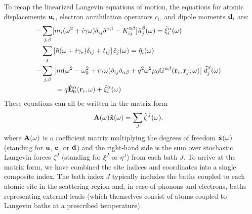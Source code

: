 To recap the linearized Langevin equations of motion, the equations for atomic displacements $\mathbf{u}_i$, electron annihilation operators $c_i$, and dipole moments $\mathbf{d}_i$ are:
\begin{subequations}
\begin{align}
   - & \sum_{j,\beta}  [m_i (\omega^2+i\gamma \omega) \delta_{ij}\delta^{\alpha\beta} - K_{ij}^{\alpha\beta}] \tilde{u}_j^{\beta}(\omega) = \tilde \xi_i^{\alpha}(\omega)  \\
  &  \sum_{j} \left[\hbar (\omega+i\gamma_e) \delta_{ij} + t_{ij} \right] \tilde c_j(\omega) = \tilde \eta_i(\omega)  \\
  - & \sum_{j,\beta} \left[m(\omega^2-\omega_0^2+i\gamma\omega) \delta_{ij}\delta_{\alpha\beta} +q^2 \omega^2 \mu_0 \mathbb{G}^{\alpha\beta}(\mathbf{r}_i,\mathbf{r}_j;\omega) \right]\tilde{d}_j^{\beta}(\omega) \notag \\
  & \qquad = q\tilde{\mathbf{E}}_0^{\alpha}(\mathbf{r}_i,\omega) + \tilde{\xi}^{\alpha}_i(\omega)
\end{align}
\end{subequations}
These equations can all be written in the matrix form
\begin{equation}
 \mathbf{A}(\omega) \tilde{\mathbf{x}}(\omega) = \sum_J \tilde \zeta^J(\omega).
\end{equation}
where $\mathbf{A}(\omega)$ is a coefficient matrix multiplying the degrees of freedom $\tilde{\mathbf{x}}(\omega)$ (standing for $\mathbf{u}$, $\mathbf{c}$, or $\mathbf{d}$) and the right-hand side is the sum over stochastic Langevin forces $\zeta^J$ (standing for $\xi^J$ or $\eta^J$) from each bath $J$. To arrive at the matrix form, we have combined the site indices and coordinates into a single composite index. The bath index $J$ typically includes the baths coupled to each atomic site in the scattering region and, in case of phonons and electrons, baths representing external leads (which themselves consist of atoms coupled to Langevin baths at a prescribed temperature). 

